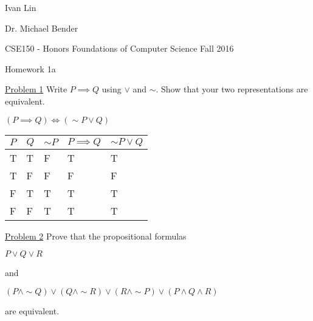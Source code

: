\documentclass{article}
\begin{document}
Ivan Lin

Dr. Michael Bender

CSE150 - Honors Foundations of Computer Science Fall 2016

\begin{center}
Homework 1a
\end{center}
\underline{Problem 1}
Write $P\implies Q$ using $\lor$ and $\sim$. Show that your two representations are equivalent.
\begin{center}
$(P\implies Q)\iff (\sim P \lor Q)$

\begin{tabular}{|l|l|l|l|l|}
  \hline $P$ & $Q$ & $\sim P$ & $P\implies Q$ & $\sim P \lor Q$\\  
  \hline T & T & F & T & T\\
  \hline T & F & F & F & F\\
  \hline F & T & T & T & T\\
  \hline F & F & T & T & T\\
  \hline
\end{tabular}
\end{center}

\underline{Problem 2}
Prove that the propositional formulas
\begin{center}
  $P\lor Q\lor R$
\end{center}
and
\begin{center}
  $(P\land\sim Q)\lor(Q\land\sim R)\lor(R\land\sim P)\lor(P\land Q\land R)$
\end{center}
are equivalent.
\end{document}
